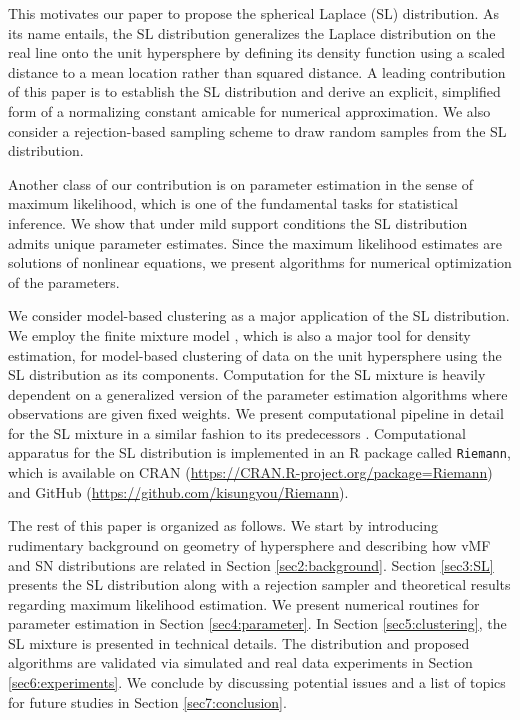 \documentclass[10pt]{article}
\begin{document}
This motivates our paper to propose the spherical Laplace (SL) distribution. As its name entails, the SL distribution generalizes the Laplace distribution on the real line onto the unit hypersphere by defining its density function using  a scaled distance to a mean location rather than squared distance. A leading contribution of this paper is to establish the SL distribution and derive an explicit, simplified form of a normalizing constant amicable for numerical approximation. We also consider a rejection-based sampling scheme to draw random samples from the SL distribution. 

Another class of our contribution is on parameter estimation in the sense of maximum likelihood, which is one of the fundamental tasks for statistical inference. We show that under mild support conditions the SL distribution admits unique parameter estimates. Since the maximum likelihood estimates are  solutions of nonlinear equations, we present algorithms for numerical optimization of the parameters. 

We consider model-based clustering \cite{bouveyron_2019_ModelbasedClusteringClassification} as a major application of the SL distribution. We employ the finite mixture model \cite{mclachlan_2019_FiniteMixtureModels}, which is also a major tool for density estimation, for model-based clustering of data on the unit hypersphere using the SL distribution as its components. Computation for the SL mixture is heavily dependent on a generalized version of the parameter estimation algorithms where observations are given fixed weights. We present computational pipeline in detail for the SL mixture in a similar fashion to its predecessors \cite{banerjee_2005_ClusteringUnitHypersphere, hornik_2014_MovMFPackageFitting}. Computational apparatus for the SL distribution is implemented in an \textsf{R} package called \texttt{Riemann}, which is available on CRAN (\url{https://CRAN.R-project.org/package=Riemann}) and GitHub (\url{https://github.com/kisungyou/Riemann}).


The rest of this paper is organized as follows. We start by introducing rudimentary background on geometry of hypersphere and describing how vMF and SN distributions are related in Section \ref{sec2:background}. Section \ref{sec3:SL} presents the SL distribution along with a rejection sampler and theoretical results regarding maximum likelihood estimation. We present numerical routines for parameter estimation in Section \ref{sec4:parameter}. In Section \ref{sec5:clustering}, the SL mixture is presented in technical details. The distribution and proposed algorithms are validated via simulated and real data experiments in Section \ref{sec6:experiments}. We conclude by discussing potential issues and a list of topics for future studies in Section \ref{sec7:conclusion}. 
\end{document}
